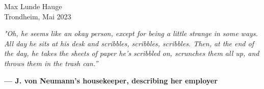 \vspace*{1cm}

\begin{flushright}
    Max Lunde Hauge\\
    Trondheim, Mai 2023
\end{flushright}

\clearpage

\thispagestyle{empty} %

\vspace*{\fill}
\begin{center}
    \textit{"Oh, he seems like an okay person, except for being a little strange in some ways. All day he sits at his desk and scribbles, scribbles, scribbles. Then, at the end of the day, he takes the sheets of paper he's scribbled on, scrunches them all up, and throws them in the trash can.”}\\
\end{center}
\begin{flushright}
    \textbf{— J. von Neumann's housekeeper, describing her employer}
\end{flushright}
\vspace*{\fill}

\restoregeometry %





